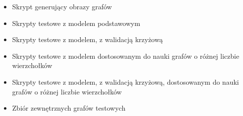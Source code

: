 
\begin{itemize}[label=-,labelsep=0.4cm,leftmargin=0.6cm]
    \item Skrypt generujący obrazy grafów
    \item Skrypty testowe z modelem podstawowym
    \item Skrypty testowe z modelem, z walidacją krzyżową
    \item Skrypty testowe z modelem dostosowanym do nauki grafów o różnej liczbie wierzchołków
    \item Skrypty testowe z modelem, z walidacją krzyżową, dostosowanym do nauki grafów o różnej liczbie wierzchołków
    \item Zbiór zewnętrznych grafów testowych
\end{itemize}